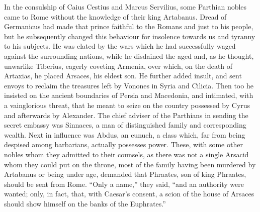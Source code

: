 In the consulship of Caius Cestius and Marcus Servilius, some Parthian nobles came to Rome without the knowledge of their king Artabanus. Dread of Germanicus had made that prince faithful to the Romans and just to his people, but he subsequently changed this behaviour for insolence towards us and tyranny to his subjects. He was elated by the wars which he had successfully waged against the surrounding nations, while he disdained the aged and, as he thought, unwarlike Tiberius, eagerly coveting Armenia, over which, on the death of Artaxias, he placed Arsaces, his eldest son. He further added insult, and sent envoys to reclaim the treasures left by Vonones in Syria and Cilicia. Then too he insisted on the ancient boundaries of Persia and Macedonia, and intimated, with a vainglorious threat, that he meant to seize on the country possessed by Cyrus and afterwards by Alexander. The chief adviser of the Parthians in sending the secret embassy was Sinnaces, a man of distinguished family and corresponding wealth. Next in influence was Abdus, an eunuch, a class which, far from being despised among barbarians, actually possesses power. These, with some other nobles whom they admitted to their counsels, as there was not a single Arsacid whom they could put on the throne, most of the family having been murdered by Artabanus or being under age, demanded that Phraates, son of king Phraates, should be sent from Rome. ``Only a name,'' they said, ``and an authority were wanted; only, in fact, that, with Caesar's consent, a scion of the house of Arsaces should show himself on the banks of the Euphrates.''


